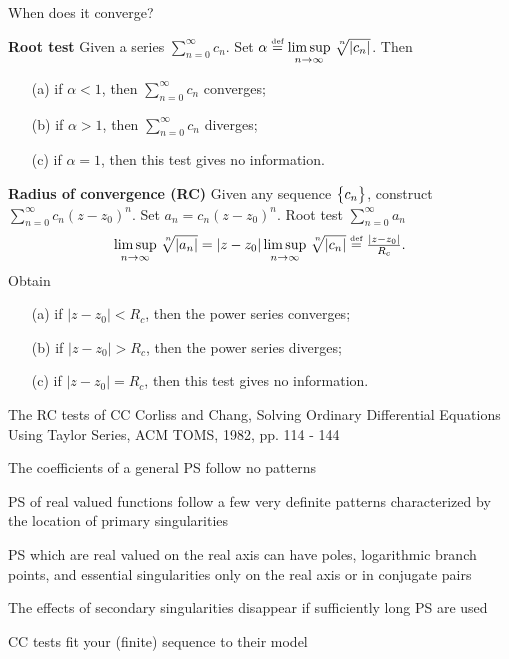 \documentclass[11pt,svgnames,fleqn]{beamer}
\newcommand{\NC}[1]{{\color{red}#1}}
\newcommand{\DM}[1]{\begin{displaymath} {#1} \end{displaymath}}
\begin{document}
\begin{frame}{When does it converge?}

  {\bf Root test}
Given a series $\sum_{n=0}^{\infty} c_n$. Set $\alpha \defeq \nlimsup{n} \proot{n}{|c_n|}$. Then
  \begin{itemize}
    \item[(a)] if $\alpha < 1$, then $\sum_{n=0}^{\infty} c_n$ converges;
    \item[(b)] if $\alpha > 1$, then $\sum_{n=0}^{\infty} c_n$ diverges;
    \item[(c)] if $\alpha = 1$, then this test gives no information.
  \end{itemize}

\vspace{2mm}

  {\bf Radius of convergence (RC)}
  \NC{Given any sequence $\bigl\{ {c_n} \bigr\}$}, construct
$\sum_{n=0}^{\infty} c_n (z-z_0)^n$. Set $a_n = c_n (z - z_0)^n$. Root test $\sum_{n=0}^{\infty} a_n$
\DM
{
  \nlimsup{n} \proot{n}{|a_n|} = |z-z_0| \nlimsup{n} \proot{n}{|c_n|} \defeq \tfrac{|z-z_0|}{R_c}.
}
Obtain
\begin{itemize}
  \item[(a)] if $|z-z_0| < R_c$, then the power series converges;
  \item[(b)] if $|z-z_0| > R_c$, then the power series diverges;
  \item[(c)] if $|z-z_0| = R_c$, then this test gives no information.
\end{itemize}
\end{frame}



\begin{frame}{The RC tests of CC}
{Corliss and Chang, Solving Ordinary Differential Equations 
  Using Taylor Series, ACM TOMS, 1982, pp. 114 - 144}

The coefficients of a general PS follow no patterns

\vspace{3mm}

  PS of real valued functions follow \NC{a few very definite patterns characterized by the
  location of primary singularities}

\vspace{3mm}

PS which are real valued on the real axis can have poles, logarithmic branch points, and essential singularities only on the real axis or in conjugate pairs

\vspace{3mm}

The effects of secondary singularities disappear if sufficiently long PS are used

\vspace{3mm}

  CC tests \NC{fit} your (finite) sequence to their model

\end{frame}
\end{document}

